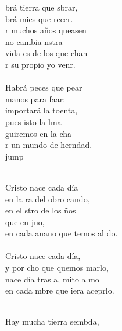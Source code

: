 \begin{cancion}%
	brá tierra que sbrar,\\
	brá mies que recer.\\
	r muchos años queasen\\
	no cambia nstra \\
	 vida es de los que chan\\
	r su propio yo venr.\\
	\jump\\
	Habrá peces que pear\\
	manos para faar;\\
	 importará la toenta,\\
	pues isto la lma\\
	guiremos en la cha\\
	r un mundo de herndad. \\jump\\
	\begin{chorus}%
	\jump\\
Cristo nace cada día\\
	en la ra del obro cando,\\
	en el stro de los ños\\
	que en juo, \\
	en cada anano que temos al do.\\
	\jump\\
Cristo nace cada día,\\
	y por cho que quemos marlo,\\
	nace día tras a, mito a mo  \\
	en cada mbre que iera aceprlo.\\
	\end{chorus}%
	\jump\\
	Hay mucha tierra sembda,\\

\end{cancion}
